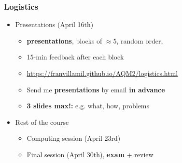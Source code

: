 \begin{frame}
  \titlepage
\end{frame}
\note{}

\begin{frame}
\frametitle{Logistics}
\centering

\begin{itemize}
\item Presentations (April 16th)
  \begin{itemize}
    \item {} \textbf{presentations}, blocks of $\approx$5, random order,
    \item[] 15-min feedback after each block
    \item[] \url{https://franvillamil.github.io/AQM2/logistics.html}
    \item Send me \textbf{presentations} by email \textbf{in advance}
    \item[] \textbf{3 slides max!:} e.g. what, how, problems
  \end{itemize}
\item Rest of the course
  \begin{itemize}
      \item Computing session (April 23rd)
      \item Final session (April 30th), \textbf{exam} + review
  \end{itemize}
\end{itemize}

\end{frame}
\note{}

